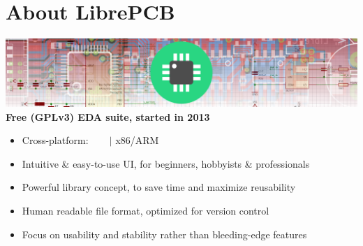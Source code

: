 \section{About LibrePCB}

\begin{frame}{\secname}
  \includegraphics[width=\linewidth]{images/about_header.png}
  \linebreak\linebreak
  \textbf{Free (GPLv3) EDA suite, started in 2013}
  \begin{itemize}
    \item Cross-platform: \faWindows\ \faApple\ \faLinux\ \faFreebsd
          \hspace{0.3em} $|$ x86/ARM
    \item Intuitive \& easy-to-use UI,
          {\footnotesize for beginners, hobbyists \& professionals}
    \item Powerful library concept,
          {\footnotesize to save time and maximize reusability}
    \item Human readable file format,
          {\footnotesize optimized for version control}
    \item Focus on usability and stability
          {\footnotesize rather than bleeding-edge features}
  \end{itemize}
\end{frame}
